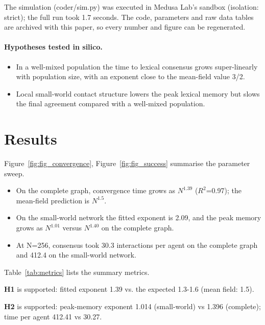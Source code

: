 \documentclass[11pt,a4paper]{article}
\begin{document}
The simulation (coder/sim.py) was executed in Medusa Lab's sandbox (isolation: strict); the full run took 1.7 seconds. The code, parameters and raw data tables are archived with this paper, so every number and figure can be regenerated.

\paragraph{Hypotheses tested in silico.}
\begin{itemize}
  \item[\textbf{H1}] In a well-mixed population the time to lexical consensus grows super-linearly with population size, with an exponent close to the mean-field value 3/2.
  \item[\textbf{H2}] Local small-world contact structure lowers the peak lexical memory but slows the final agreement compared with a well-mixed population.
\end{itemize}
\section{Results}
Figure~\ref{fig:fig_convergence}, Figure~\ref{fig:fig_success} summarise the parameter sweep.

\begin{itemize}
  \item On the complete graph, convergence time grows as $N^{1.39}$ ($R^{2}$=0.97); the mean-field prediction is $N^{1.5}$.
  \item On the small-world network the fitted exponent is 2.09, and the peak memory grows as $N^{1.01}$ versus $N^{1.40}$ on the complete graph.
  \item At N=256, consensus took 30.3 interactions per agent on the complete graph and 412.4 on the small-world network.
\end{itemize}

Table~\ref{tab:metrics} lists the summary metrics.

\textbf{H1} is supported: fitted exponent 1.39 vs. the expected 1.3-1.6 (mean field: 1.5).

\textbf{H2} is supported: peak-memory exponent 1.014 (small-world) vs 1.396 (complete); time per agent 412.41 vs 30.27.
\end{document}
